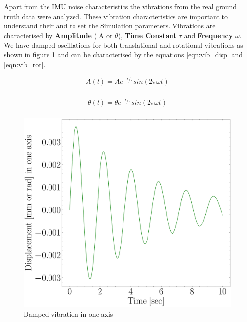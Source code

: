 Apart from the IMU noise characteristics the vibrations from the real ground truth data were analyzed. These vibration characteristics are important to understand their and to set the Simulation parameters. Vibrations are characterised by \textbf{Amplitude} ( A or  $ \theta $), \textbf{Time Constant} $ \tau $ and \textbf{Frequency} $ \omega $. We have damped oscillations for both translational and rotational vibrations as shown in figure \ref{fig:damped_vib} and can be characterised by the equations \ref{eqn:vib_disp} and \ref{eqn:vib_rot}.

\begin{equation}
  \label{eqn:vib_disp}
  \begin{aligned}
    A(t) = Ae^{-t/\tau}sin(2\pi\omega t) \\
  \end{aligned}
\end{equation}

\begin{equation}
  \label{eqn:vib_rot}
  \begin{aligned}
    \theta(t) = \theta e^{-t/\tau}sin(2\pi\omega t) \\
  \end{aligned}
\end{equation}

\begin{figure}[H]
    \centering
    \includegraphics[scale=0.4]{images/fig_chapter4/vib_damped.pdf}
    \caption{Damped vibration in one axis}
    \label{fig:damped_vib}
\end{figure}

